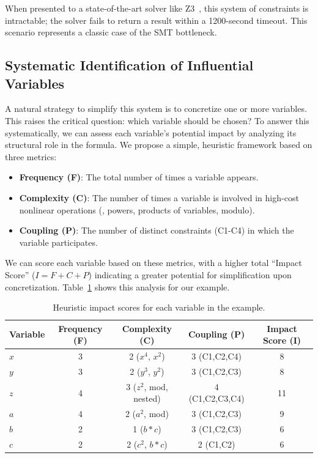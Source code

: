 When presented to a state-of-the-art solver like Z3~\cite{demoura2008z3}, this system of constraints is intractable; the solver fails to return a result within a 1200-second timeout. This scenario represents a classic case of the SMT bottleneck.

\subsection{Systematic Identification of Influential Variables}

A natural strategy to simplify this system is to concretize one or more variables. This raises the critical question: which variable should be chosen? To answer this systematically, we can assess each variable's potential impact by analyzing its structural role in the formula. We propose a simple, heuristic framework based on three metrics:
\begin{itemize}
    \item \textbf{Frequency (F)}: The total number of times a variable appears.
    \item \textbf{Complexity (C)}: The number of times a variable is involved in high-cost nonlinear operations (\eg, powers, products of variables, modulo).
    \item \textbf{Coupling (P)}: The number of distinct constraints (C1-C4) in which the variable participates.
\end{itemize}

We can score each variable based on these metrics, with a higher total ``Impact Score'' ($I = F+C+P$) indicating a greater potential for simplification upon concretization. Table~\ref{tab:impact-score} shows this analysis for our example.

\begin{table}[h]
\centering
\caption{Heuristic impact scores for each variable in the example.}
\label{tab:impact-score}
\begin{tabular}{@{}lcccc@{}}
\toprule
\textbf{Variable} & \textbf{Frequency (F)} & \textbf{Complexity (C)} & \textbf{Coupling (P)} & \textbf{Impact Score (I)} \\ \midrule
$x$ & 3 & 2 ($x^4$, $x^2$) & 3 (C1,C2,C4) & 8 \\
$y$ & 3 & 2 ($y^3$, $y^2$) & 3 (C1,C2,C3) & 8 \\
$z$ & 4 & 3 ($z^2$, mod, nested) & 4 (C1,C2,C3,C4) & 11 \\
$a$ & 4 & 2 ($a^2$, mod) & 3 (C1,C2,C3) & 9 \\
$b$ & 2 & 1 ($b*c$) & 3 (C1,C2,C3) & 6 \\
$c$ & 2 & 2 ($c^2$, $b*c$) & 2 (C1,C2) & 6 \\ \bottomrule
\end{tabular}
\end{table}

